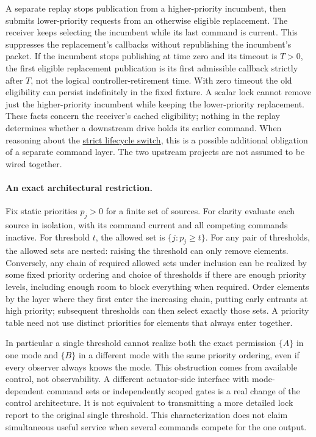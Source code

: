 \documentclass{article}
\begin{document}
A separate replay stops publication from a higher-priority incumbent, then submits lower-priority requests from an otherwise eligible replacement. The receiver keeps selecting the incumbent while its last command is current. This suppresses the replacement's callbacks without republishing the incumbent's packet. If the incumbent stops publishing at time zero and its timeout is \(T>0\), the first eligible replacement publication is its first admissible callback strictly after \(T\), not the logical controller-retirement time. With zero timeout the old eligibility can persist indefinitely in the fixed fixture. A scalar lock cannot remove just the higher-priority incumbent while keeping the lower-priority replacement. These facts concern the receiver's cached eligibility; nothing in the replay determines whether a downstream drive holds its earlier command. When reasoning about the \href{https://github.com/eternal-november/eos-research-programmes/pull/460}{strict lifecycle switch}, this is a possible additional obligation of a separate command layer. The two upstream projects are not assumed to be wired together.

\paragraph{An exact architectural restriction.}
Fix static priorities \(p_j>0\) for a finite set of sources. For clarity evaluate each source in isolation, with its command current and all competing commands inactive. For threshold \(t\), the allowed set is \(\{j:p_j\ge t\}\). For any pair of thresholds, the allowed sets are nested: raising the threshold can only remove elements. Conversely, any chain of required allowed sets under inclusion can be realized by some fixed priority ordering and choice of thresholds if there are enough priority levels, including enough room to block everything when required. Order elements by the layer where they first enter the increasing chain, putting early entrants at high priority; subsequent thresholds can then select exactly those sets. A priority table need not use distinct priorities for elements that always enter together.

In particular a single threshold cannot realize both the exact permission \(\{A\}\) in one mode and \(\{B\}\) in a different mode with the same priority ordering, even if every observer always knows the mode. This obstruction comes from available control, not observability. A different actuator-side interface with mode-dependent command sets or independently scoped gates is a real change of the control architecture. It is not equivalent to transmitting a more detailed lock report to the original single threshold. This characterization does not claim simultaneous useful service when several commands compete for the one output.
\end{document}
